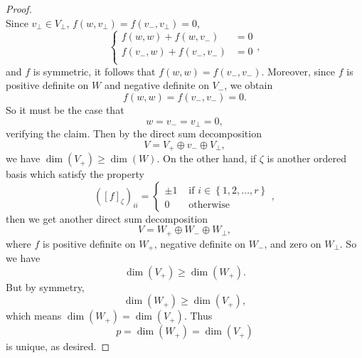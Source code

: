 \documentclass[linearalgebra]{subfiles}
\begin{document}
\begin{proof}
\begin{equation*}
        \end{equation*}
        Since $v_\perp\in V_\perp$, $f\left( w,v_\perp \right) = f\left( v_-,v_\perp \right) = 0$,
        \begin{equation*}
            \begin{cases} 
                f\left( w,w \right) + f\left( w,v_- \right) & = 0 \\
                f\left( v_-,w \right) + f\left( v_-,v_- \right) & = 0 \\
            \end{cases},
        \end{equation*}
        and $f$ is symmetric, it follows that $f\left( w,w \right) = f\left( v_-,v_- \right)$. Moreover, since $f$ is positive definite on $W$ and negative definite on $V_-$, we obtain
        \begin{equation*}
            f\left( w,w \right) = f\left( v_-,v_- \right) = 0.
        \end{equation*}
        So it must be the case that
        \begin{equation*}
            w = v_- = v_\perp = 0,
        \end{equation*}
        verifying the claim. Then by the direct sum decomposition
        \begin{equation*}
            V = V_+\oplus v_-\oplus V_\perp,
        \end{equation*}
        we have $\dim\left( V_+ \right) \geq \dim\left( W \right)$. On the other hand, if $\zeta$ is another ordered basis which satisfy the property
        \begin{equation*}
            \left( \left[ f \right] _\zeta \right) _{ii} =
            \begin{cases} 
                \pm 1 & \text{ if } i\in\left\lbrace 1,2,\ldots,r \right\rbrace \\ 
                0 & \text{ otherwise }
            \end{cases},
        \end{equation*}
        then we get another direct sum decomposition
        \begin{equation*}
            V = W_+\oplus W_-\oplus W_\perp,
        \end{equation*}
        where $f$ is positive definite on $W_+$, negative definite on $W_-$, and zero on $W_\perp$. So we have
        \begin{equation*}
            \dim\left( V_+ \right) \geq \dim\left( W_+ \right) .
        \end{equation*}
        But by symmetry,
        \begin{equation*}
            \dim\left( W_+ \right) \geq \dim\left( V_+ \right) ,
        \end{equation*}
        which means $\dim\left( W_+ \right) = \dim\left( V_+ \right)$. Thus
        \begin{equation*}
            p = \dim\left( W_+ \right) = \dim\left( V_+ \right) 
        \end{equation*}
        is unique, as desired.
    \end{proof}
\end{document}
